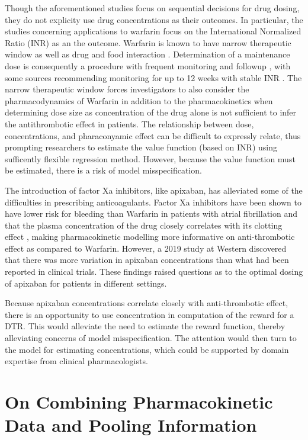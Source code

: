 Though the aforementioned studies focus on sequential decisions for drug dosing, they do not explicity use drug concentrations as their outcomes. In particular, the studies concerning applications to warfarin focus on the International Normalized Ratio (INR) as an the outcome. Warfarin is known to have narrow therapeutic window \cite{merli2009warfarin} as well as drug and food interaction \cite{juurlink2007drug}. Determination of a maintenance dose is consequently a procedure with frequent monitoring and followup \cite{carris2015feasibility}, with some sources recommending monitoring for up to 12 weeks with stable INR \cite{holbrook2012evidence}. The narrow therapeutic window forces investigators to also consider the pharmacodynamics of Warfarin in addition to the pharmacokinetics when determining dose size as concentration of the drug alone is not sufficient to infer the antithrombotic effect in patients. The relationship between dose, concentrations, and pharaconyamic effect can be difficult to expressly relate, thus prompting researchers to estimate the value function (based on INR) using sufficently flexible regression method. However, because the value function must be estimated, there is a risk of model misspecification.

The introduction of factor Xa inhibitors, like apixaban, has alleviated some of the difficulties in prescribing anticoagulants. Factor Xa inhibitors have been shown to have lower risk for bleeding than Warfarin in patients with atrial fibrillation \cite{touma2015meta} and that the plasma concentration of the drug closely correlates with its clotting effect \cite{Byon2019-gf}, making pharmacokinetic modelling more informative on anti-thrombotic effect as compared to Warfarin. However, a 2019 study at Western \cite{sukumar2019apixaban} discovered that there was more variation in apixaban concentrations than what had been reported in clinical trials.  These findings raised questions as to the optimal dosing of apixaban for patients in different settings.

Because apixaban concentrations correlate closely with anti-thrombotic effect, there is an opportunity to use concentration in computation of the reward for a DTR.  This would alleviate the need to estimate the reward function, thereby alleviating concerns of model misspecification.  The attention would then turn to the model for estimating concentrations, which could be supported by domain expertise from clinical pharmacologists.

\section{On Combining Pharmacokinetic Data and Pooling Information}

